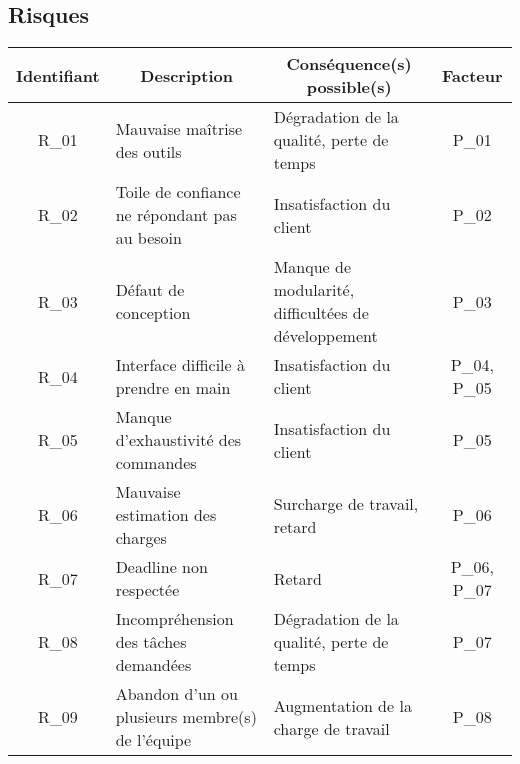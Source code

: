 \documentclass{../res/univ-projet}
\begin{document}
\subsection{Risques}
\begin{tabular}{| c | p{5.5cm} | p{5.5cm} | c |} 
		\hline
		\multicolumn{1}{|c|}{\cellcolor{blue} \color{white}Identifiant} & \multicolumn{1}{c|}{\cellcolor{blue} \color{white}Description} 
		& \multicolumn{1}{c|}{\cellcolor{blue} \color{white}Conséquence(s) possible(s)} & \multicolumn{1}{c|}{\cellcolor{blue} \color{white}Facteur} \\ \hline
		R\_01 & Mauvaise maîtrise des outils & Dégradation de la qualité, perte de temps & P\_01 \\ \hline
		R\_02 & Toile de confiance ne répondant pas au besoin & Insatisfaction du client & P\_02 \\ \hline
		R\_03 & Défaut de conception & Manque de modularité, difficultées de développement & P\_03 \\ \hline
		R\_04 & Interface difficile à prendre en main & Insatisfaction du client & P\_04, P\_05 \\ \hline
		R\_05 & Manque d'exhaustivité des commandes & Insatisfaction du client & P\_05 \\ \hline
		R\_06 & Mauvaise estimation des charges & Surcharge de travail, retard & P\_06 \\ \hline
		R\_07 & Deadline non respectée & Retard & P\_06, P\_07 \\ \hline
		R\_08 & Incompréhension des tâches demandées & Dégradation de la qualité, perte de temps & P\_07 \\ \hline
		R\_09 & Abandon d'un ou plusieurs membre(s) de l'équipe & Augmentation de la charge de travail & P\_08 \\ \hline
	\end{tabular} \\
\end{document}
